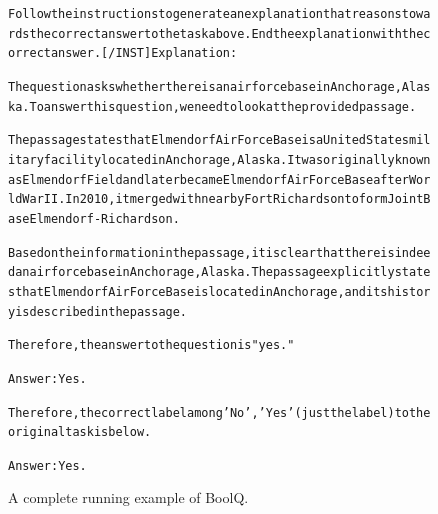 \begin{figure}[t]
{{\begin{alltt}
Follow the instructions to generate an explanation that reasons towards the correct answer to the task above. End the explanation with the correct answer. [/INST] Explanation: 

The question asks whether there is an air force base in Anchorage, Alaska. To answer this question, we need to look at the provided passage.

The passage states that Elmendorf Air Force Base is a United States military facility located in Anchorage, Alaska. It was originally known as Elmendorf Field and later became Elmendorf Air Force Base after World War II. In 2010, it merged with nearby Fort Richardson to form Joint Base Elmendorf-Richardson.

Based on the information in the passage, it is clear that there is indeed an air force base in Anchorage, Alaska. The passage explicitly states that Elmendorf Air Force Base is located in Anchorage, and its history is described in the passage.

Therefore, the answer to the question is "yes."

Answer: Yes.

Therefore, the correct label among {'No', 'Yes'} (just the label) to the original task is below.

Answer: Yes.
\end{alltt}
}}
\caption{A complete running example of BoolQ.}
\label{fig:boolq_example}
\end{figure}
